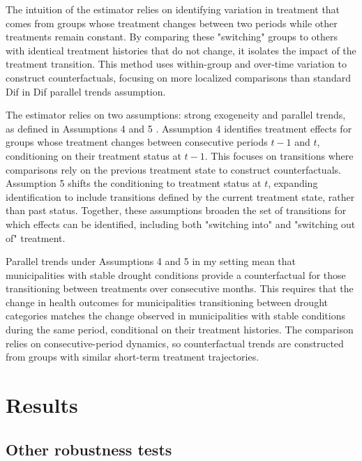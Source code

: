 \documentclass[12pt, oneside]{article}      %
\begin{document}
The intuition of the estimator relies on identifying variation in treatment that comes from groups whose treatment changes between two periods while other treatments remain constant. By comparing these "switching" groups to others with identical treatment histories that do not change, it isolates the impact of the treatment transition. This method uses within-group and over-time variation to construct counterfactuals, focusing on more localized comparisons than standard Dif in Dif parallel trends assumption.

The estimator relies on two assumptions: strong exogeneity and parallel trends, as defined in Assumptions 4 and 5 \cite{deChaisemartin2023}. Assumption 4 identifies treatment effects for groups whose treatment changes between consecutive periods $t-1$ and $t$, conditioning on their treatment status at $t-1$. This focuses on transitions where comparisons rely on the previous treatment state to construct counterfactuals. Assumption 5 shifts the conditioning to treatment status at $t$, expanding identification to include transitions defined by the current treatment state, rather than past status. Together, these assumptions broaden the set of transitions for which effects can be identified, including both "switching into" and "switching out of" treatment.

Parallel trends under Assumptions 4 and 5 in my setting mean that municipalities with stable drought conditions provide a counterfactual for those transitioning between treatments over consecutive months. This requires that the change in health outcomes for municipalities transitioning between drought categories matches the change observed in municipalities with stable conditions during the same period, conditional on their treatment histories. The comparison relies on consecutive-period dynamics, so counterfactual trends are constructed from groups with similar short-term treatment trajectories.

\section{Results}








\subsection{Other robustness tests}
\end{document}
